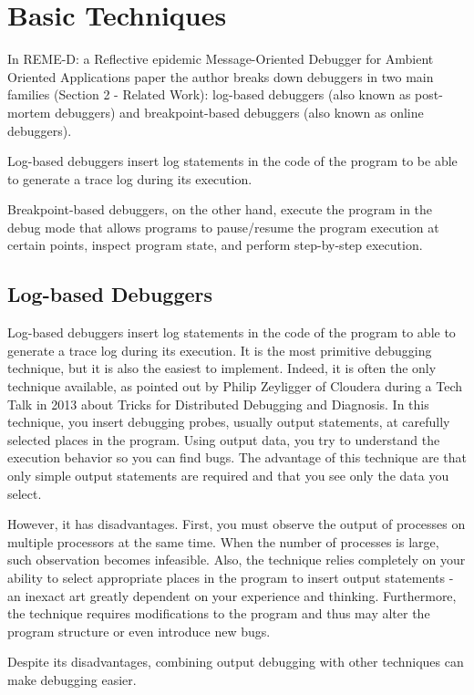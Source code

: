 \section{Basic Techniques}

In REME-D: a Reflective epidemic Message-Oriented Debugger for Ambient Oriented Applications paper the author breaks down debuggers in two main families (Section 2 - Related Work): log-based debuggers (also known as post-mortem debuggers) and breakpoint-based debuggers (also known as online debuggers).

	Log-based debuggers insert log statements in the code of the program to be able to generate a trace log during its execution.
	
	Breakpoint-based debuggers, on the other hand, execute the program in the debug mode that allows programs to pause/resume the program execution at certain points, inspect program state, and perform step-by-step execution.
	
\subsection{Log-based Debuggers}

	Log-based debuggers insert log statements in the code of the program to able to generate a trace log during its execution. It is the most primitive debugging technique, but it is also the easiest to implement. Indeed, it is often the only technique available, as pointed out by Philip Zeyligger of Cloudera during a Tech Talk in 2013 about Tricks for Distributed Debugging and Diagnosis. In this technique, you insert debugging probes, usually output statements, at carefully selected places in the program. Using output data, you try to understand the execution behavior so you can find bugs. The advantage of this technique are that only simple output statements are required and that you see only the data you select.
	
	However, it has disadvantages. First, you must observe the output of processes on multiple processors at the same time. When the number of processes is large, such observation becomes infeasible. Also, the technique relies completely on your ability to select appropriate places in the program to insert output statements - an inexact art greatly dependent on your experience and thinking. Furthermore, the technique requires modifications to the program and thus may alter the program structure or even introduce new bugs.
	
	Despite its disadvantages, combining output debugging with other techniques can make debugging easier.
	
